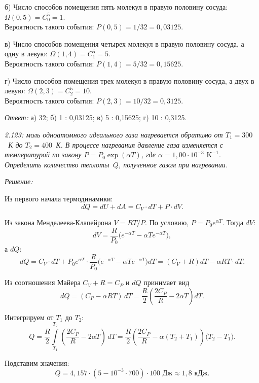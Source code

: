 \documentclass[pscyr]{hedsemwork}
\begin{document}
б) Число способов помещения пять молекул в правую половину сосуда:
\( \Omega(0, 5) = C_0^5 = 1 \).\\
Вероятность такого события: \( P(0, 5) = 1/32 = 0,\!03125 \).

в) Число способов помещения четырех молекул в правую половину сосуда, а одну в
левую: \( \Omega(1, 4) = C_1^5 = 5 \).\\
Вероятность такого события: \( P(1, 4) = 5/32 = 0,\!15625 \).

г) Число способов помещения трех молекул в правую половину сосуда, а двух в
левую: \( \Omega(2, 3) = C_2^5 = 10 \).\\
Вероятность такого события: \( P(2, 3) = 10/32 = 0,\!3125 \).

\vspace*{2em}
\emph{Ответ:} а) 32; б) 1 : 0,03125; в) 5 : 0,15625; г) 10 : 0,3125.

\newpage %

\emph{2.123: моль одноатомного идеального газа нагревается обратимо от
\( T_1 = 300 \)~К до \( T_2 = 400 \)~К. В процессе нагревания давление газа
изменяется с температурой по закону \( P = P_0 \exp(\alpha T) \), где
\( \alpha = 1,\!00 \cdot 10^{-3} \text{ K}^{-1} \). Определить количество
теплоты~\( Q \), полученное газом при нагревании.}

\vspace*{2em}
\emph{Решение:}

Из первого начала термодинамики:
\[
  dQ = dU + dA = C_V\cdot dT + P\cdot dV.
\]

Из закона Менделеева-Клапейрона \( V = RT/P \). По условию,
\( P = P_0e^{\alpha T} \). Тогда \( dV \):
\[
  dV = \frac{R}{P_0} \Big( e^{-\alpha T} - \alpha Te^{-\alpha T} \Big),
\]
а \( dQ \):
\[
  dQ = C_V\cdot dT + P_0e^{\alpha T}\cdot \frac{R}{P_0}\Big( e^{-\alpha T} -
  \alpha Te^{-\alpha T} \Big)dT = (C_V + R)dT - \alpha RT\cdot dT.
\]

Из соотношения Майера \( C_V + R = C_P \) и \( dQ \) принимает вид
\[
  dQ = (C_P - \alpha RT)\,dT = \frac{R}{2}\left(\frac{2C_P}{R} -
  2\alpha T\right)dT.
\]

Интегрируем от \( T_1 \) до \( T_2 \):
\[
  Q = \frac{R}{2}\int\limits_{T_1}^{T_2} \left(\frac{2C_P}{R} -
  2\alpha T\right)\,dT = \frac{R}{2}\left(\frac{2C_P}{R} - \alpha
  (T_2 + T_1)\right)\bigg(T_2 - T_1\bigg).
\]

Подставим значения:
\[
  Q = 4,\!157\cdot(5 - 10^{-3}\cdot 700) \cdot 100 \text{ Дж} \approx 1,\!8
  \text{ кДж}.
\]
\end{document}

